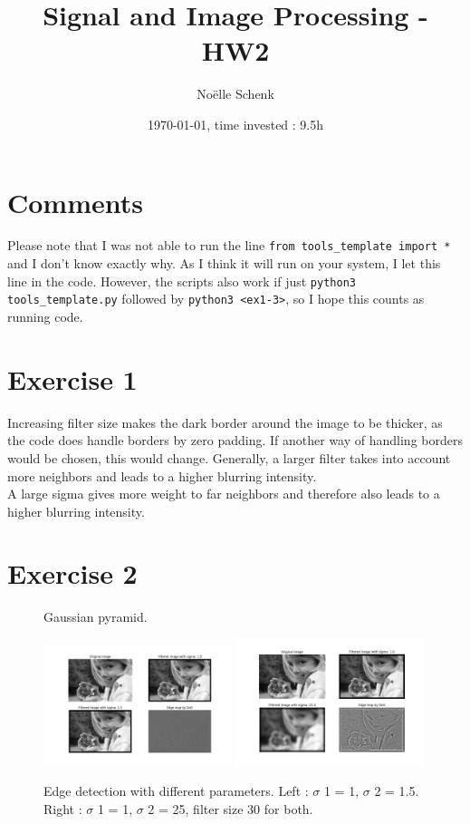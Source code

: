 \documentclass[a4paper,8pt]{extarticle}\usepackage[]{graphicx}\usepackage[]{color}
\title{Signal and Image Processing - HW2}
\author{Noëlle Schenk}
\date{\today, time invested : 9.5h}
\begin{document}
\maketitle
\section{Comments}
Please note that I was not able to run the line \lstinline!from tools_template import *! and I don't know exactly why. As I think it will run on your system, I let this line in the code. However, the scripts also work if just \lstinline!python3 tools_template.py! followed by \lstinline!python3 <ex1-3>!, so I hope this counts as running code.

\section{Exercise 1}
Increasing filter size makes the dark border around the image to be thicker, as the code does handle borders by zero padding. If another way of handling borders would be chosen, this would change. Generally, a larger filter takes into account more neighbors and leads to a higher blurring intensity. \\
A large sigma gives more weight to far neighbors and therefore also leads to a higher blurring intensity.

\section{Exercise 2}
\begin{figure}
  \caption{Gaussian pyramid.}
  \centering
    \includegraphics[width=0.49\textwidth]{figs/ex2_1.png}
    \includegraphics[width=0.49\textwidth]{figs/ex2_2.png}
  \label{fig:edges}
  \caption{Edge detection with different parameters. Left : $\sigma$ 1 = 1, $\sigma$ 2 = 1.5. Right : $\sigma$ 1 = 1, $\sigma$ 2 = 25, filter size 30 for both.}
\end{figure}
\end{document}

